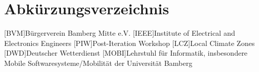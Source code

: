 \chapter*{Abkürzungsverzeichnis}

\begin{acronym}
    [BVM]{Bürgerverein Bamberg Mitte e.V.}
    [IEEE]{Institute of Electrical and Electronics Engineers}
    [PIW]{Post-Iteration Workshop}
    [LCZ]{Local Climate Zones}
    [DWD]{Deutscher Wetterdienst}
    [MOBI]{Lehrstuhl für Informatik, insbesondere Mobile Softwaresysteme/Mobilität der Universität Bamberg}
\end{acronym}